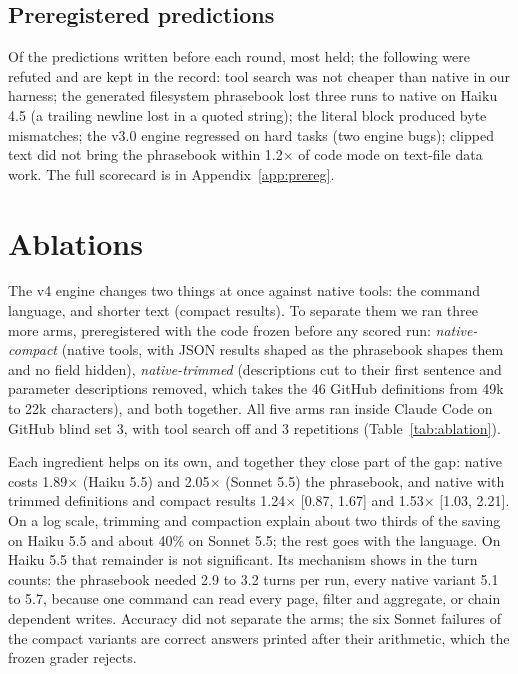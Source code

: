 \documentclass[11pt]{article}
\begin{document}
\subsection{Preregistered predictions}
Of the predictions written before each round, most held; the following were refuted and are kept in the record: tool search was not cheaper than native in our harness; the generated filesystem phrasebook lost three runs to native on Haiku 4.5 (a trailing newline lost in a quoted string); the literal block produced byte mismatches; the v3.0 engine regressed on hard tasks (two engine bugs); clipped text did not bring the phrasebook within 1.2$\times$ of code mode on text-file data work. The full scorecard is in Appendix~\ref{app:prereg}.

\section{Ablations}
\label{sec:ablations}
The v4 engine changes two things at once against native tools: the command language, and shorter text (compact results). To separate them we ran three more arms, preregistered with the code frozen before any scored run: \emph{native-compact} (native tools, with JSON results shaped as the phrasebook shapes them and no field hidden), \emph{native-trimmed} (descriptions cut to their first sentence and parameter descriptions removed, which takes the 46 GitHub definitions from 49k to 22k characters), and both together. All five arms ran inside Claude Code on GitHub blind set 3, with tool search off and 3 repetitions (Table~\ref{tab:ablation}).



Each ingredient helps on its own, and together they close part of the gap: native costs 1.89$\times$ (Haiku 5.5) and 2.05$\times$ (Sonnet 5.5) the phrasebook, and native with trimmed definitions and compact results 1.24$\times$ [0.87, 1.67] and 1.53$\times$ [1.03, 2.21]. On a log scale, trimming and compaction explain about two thirds of the saving on Haiku 5.5 and about 40\% on Sonnet 5.5; the rest goes with the language. On Haiku 5.5 that remainder is not significant. Its mechanism shows in the turn counts: the phrasebook needed 2.9 to 3.2 turns per run, every native variant 5.1 to 5.7, because one command can read every page, filter and aggregate, or chain dependent writes. Accuracy did not separate the arms; the six Sonnet failures of the compact variants are correct answers printed after their arithmetic, which the frozen grader rejects.
\end{document}
